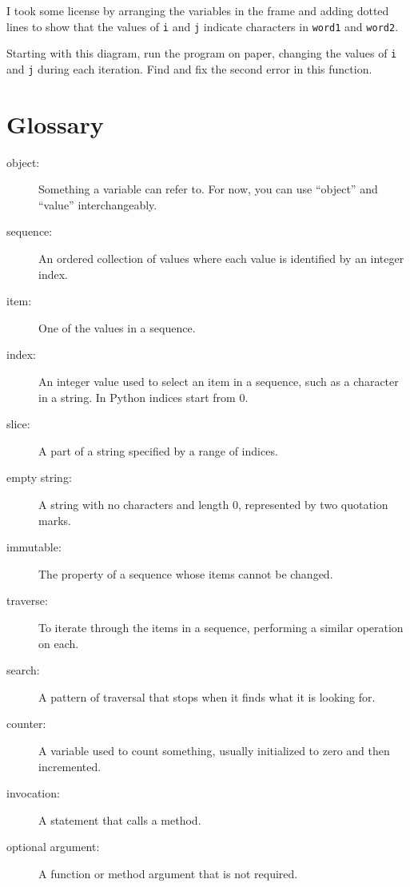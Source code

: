 \documentclass[10pt]{book}
\begin{document}
I took some license by arranging the variables in the frame
and adding dotted lines to show that the values of {\tt i} and
{\tt j} indicate characters in {\tt word1} and {\tt word2}.

Starting with this diagram, run the program on paper, changing the
values of {\tt i} and {\tt j} during each iteration.  Find and fix the
second error in this function.
\label{isreverse}


\section{Glossary}

\begin{description}

\item[object:] Something a variable can refer to.  For now,
you can use ``object'' and ``value'' interchangeably.

\item[sequence:] An ordered collection of
values where each value is identified by an integer index.

\item[item:] One of the values in a sequence.

\item[index:] An integer value used to select an item in
a sequence, such as a character in a string.  In Python
indices start from 0.

\item[slice:] A part of a string specified by a range of indices.

\item[empty string:] A string with no characters and length 0, represented
by two quotation marks.

\item[immutable:] The property of a sequence whose items cannot
be changed.

\item[traverse:] To iterate through the items in a sequence,
performing a similar operation on each.

\item[search:] A pattern of traversal that stops
when it finds what it is looking for.

\item[counter:] A variable used to count something, usually initialized
to zero and then incremented.

\item[invocation:] A statement that calls a method.

\item[optional argument:] A function or method argument that is not
required.

\end{description}
\end{document}
